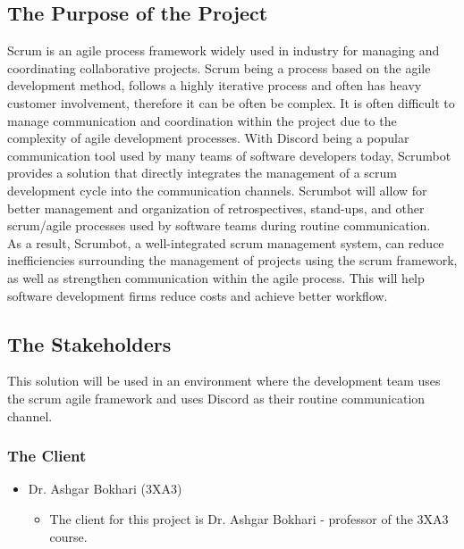 \documentclass[12pt, titlepage]{article}
\begin{document}
\subsection{The Purpose of the Project}
Scrum is an agile process framework widely used in industry for managing and coordinating collaborative projects. Scrum being a process based on the agile development method, follows a highly iterative process and often has heavy customer involvement, therefore it can be often be complex. It is often difficult to manage communication and coordination within the project due to the complexity of agile development processes. With Discord being a popular communication tool used by many teams of software developers today, Scrumbot provides a solution that directly integrates the management of a scrum development cycle into the communication channels. Scrumbot will allow for better management and organization of retrospectives, stand-ups, and other scrum/agile processes used by software teams during routine communication.\\

As a result, Scrumbot, a well-integrated scrum management system, can reduce inefficiencies surrounding the management of projects using the scrum framework, as well as strengthen communication within the agile process. This will help software development firms reduce costs and achieve better workflow.

\subsection{The Stakeholders}
This solution will be used in an environment where the development team uses the scrum agile framework and uses Discord as their routine communication channel.
\subsubsection{The Client}
\begin{itemize}
    \item Dr. Ashgar Bokhari (3XA3)
    \begin{itemize}
      \item[] The client for this project is Dr. Ashgar Bokhari - professor of the 3XA3 course.
    \end{itemize}
\end{itemize}
\end{document}
